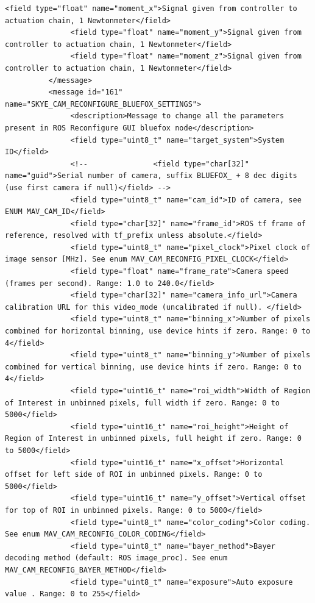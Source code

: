 \begin{lstlisting}[captionpos=b, caption="Definition of \textsc{Skye} specific Mavlink messages", label=app_xml]
               <field type="float" name="moment_x">Signal given from controller to actuation chain, 1 Newtonmeter</field>
               <field type="float" name="moment_y">Signal given from controller to actuation chain, 1 Newtonmeter</field>
               <field type="float" name="moment_z">Signal given from controller to actuation chain, 1 Newtonmeter</field>
          </message>
          <message id="161" name="SKYE_CAM_RECONFIGURE_BLUEFOX_SETTINGS">
               <description>Message to change all the parameters present in ROS Reconfigure GUI bluefox node</description>
               <field type="uint8_t" name="target_system">System ID</field>
               <!--               <field type="char[32]" name="guid">Serial number of camera, suffix BLUEFOX_ + 8 dec digits (use first camera if null)</field> -->
               <field type="uint8_t" name="cam_id">ID of camera, see ENUM MAV_CAM_ID</field>
               <field type="char[32]" name="frame_id">ROS tf frame of reference, resolved with tf_prefix unless absolute.</field>
               <field type="uint8_t" name="pixel_clock">Pixel clock of image sensor [MHz]. See enum MAV_CAM_RECONFIG_PIXEL_CLOCK</field>
               <field type="float" name="frame_rate">Camera speed (frames per second). Range: 1.0 to 240.0</field>
               <field type="char[32]" name="camera_info_url">Camera calibration URL for this video_mode (uncalibrated if null). </field>
               <field type="uint8_t" name="binning_x">Number of pixels combined for horizontal binning, use device hints if zero. Range: 0 to 4</field>
               <field type="uint8_t" name="binning_y">Number of pixels combined for vertical binning, use device hints if zero. Range: 0 to 4</field>
               <field type="uint16_t" name="roi_width">Width of Region of Interest in unbinned pixels, full width if zero. Range: 0 to 5000</field>
               <field type="uint16_t" name="roi_height">Height of Region of Interest in unbinned pixels, full height if zero. Range: 0 to 5000</field>
               <field type="uint16_t" name="x_offset">Horizontal offset for left side of ROI in unbinned pixels. Range: 0 to 5000</field>
               <field type="uint16_t" name="y_offset">Vertical offset for top of ROI in unbinned pixels. Range: 0 to 5000</field>
               <field type="uint8_t" name="color_coding">Color coding. See enum MAV_CAM_RECONFIG_COLOR_CODING</field>
               <field type="uint8_t" name="bayer_method">Bayer decoding method (default: ROS image_proc). See enum MAV_CAM_RECONFIG_BAYER_METHOD</field>
               <field type="uint8_t" name="exposure">Auto exposure value . Range: 0 to 255</field>

\end{lstlisting}
